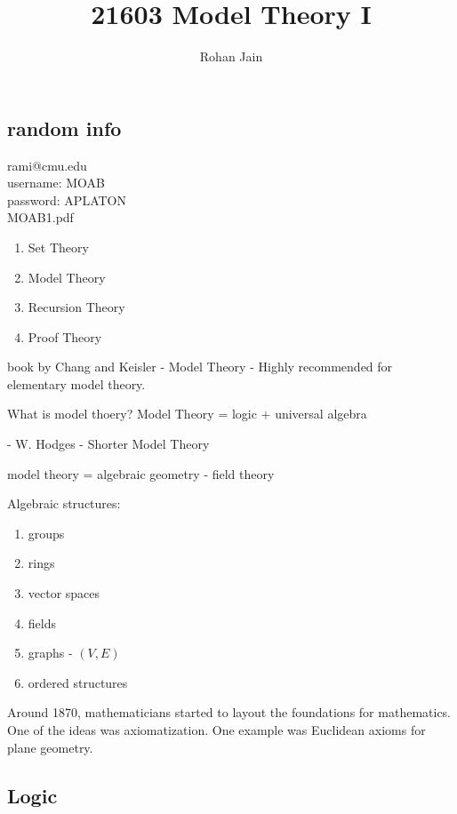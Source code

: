 \documentclass{report}
\title{\Huge{21603 Model Theory I}}
\author{\huge{Rohan Jain}}
\date{}
\begin{document}
\maketitle
\newpage%
\tableofcontents

\pagebreak

\chapter{}
\section{random info}
rami@cmu.edu \\
username: MOAB \\
password: APLATON \\
MOAB1.pdf
\begin{enumerate}
    \item Set Theory
    \item Model Theory
    \item Recursion Theory
    \item Proof Theory
\end{enumerate}

 book by Chang and Keisler - Model Theory - Highly recommended for elementary model theory. 

\noindent What is model thoery? Model Theory = logic + universal algebra

 - W. Hodges - Shorter Model Theory

\noindent model theory = algebraic geometry - field theory

\noindent Algebraic structures:
\begin{enumerate}
    \item groups
    \item rings
    \item vector spaces 
    \item fields
    \item graphs - $(V, E)$
    \item ordered structures
\end{enumerate}

Around 1870, mathematicians started to layout the foundations for mathematics. One of the ideas was axiomatization. One example was Euclidean axioms for plane geometry. 

\section{Logic}
\end{document}
